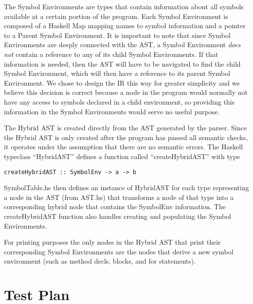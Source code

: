 \documentclass[11pt]{article}
\begin{document}
The Symbol Environments are types that contain information about all symbols available at a certain portion of the program. Each Symbol Environment is composed of a Haskell Map mapping names to symbol information and a pointer to a Parent Symbol Environment. It is important to note that since Symbol Environments are deeply connected with the AST, a Symbol Environment \emph{does not} contain a reference to any of its child Symbol Environments. If that information is needed, then the AST will have to be navigated to find the child Symbol Environment, which will then have a reference to its parent Symbol Environment. We chose to design the IR this way for greater simplicity and we believe this decision is correct because a node in the program would normally not have any access to symbols declared in a child environment, so providing this information in the Symbol Environments would serve no useful purpose. 

The Hybrid AST is created directly from the AST generated by the parser. Since the Hybrid AST is only created after the program has passed all semantic checks, it operates under the assumption that there are no semantic errors. The Haskell typeclass ``HybridAST'' defines a function called ``createHybridAST'' with type 
\begin{verbatim}
createHybridAST :: SymbolEnv -> a -> b
\end{verbatim} 

SymbolTable.hs then defines an instance of HybridAST for each type representing a node in the AST (from AST.hs) that transforms a node of that type into a corresponding hybrid node that contains the SymbolEnv information. The createHybridAST function also handles creating and populating the Symbol Environments.

For printing purposes the only nodes in the Hybrid AST that print their corresponding Symbol Environments are the nodes that derive a new symbol environment (such as method decls, blocks, and for statements). 

\section{Test Plan}
\label{sec:test}
\end{document}
